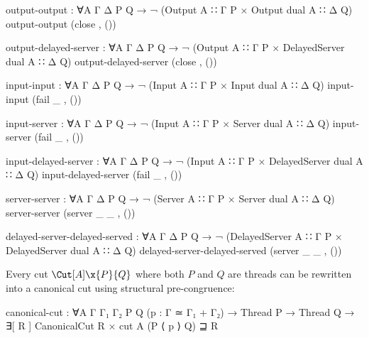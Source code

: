\begin{code}[hide]
output-output : ∀{A Γ Δ P Q} → ¬ (Output {A ∷ Γ} P × Output {dual A ∷ Δ} Q)
output-output (close , ())

output-delayed-server : ∀{A Γ Δ P Q} → ¬ (Output {A ∷ Γ} P × DelayedServer {dual A ∷ Δ} Q)
output-delayed-server (close , ())

input-input : ∀{A Γ Δ P Q} → ¬ (Input {A ∷ Γ} P × Input {dual A ∷ Δ} Q)
input-input (fail _ , ())

input-server : ∀{A Γ Δ P Q} → ¬ (Input {A ∷ Γ} P × Server {dual A ∷ Δ} Q)
input-server (fail _ , ())

input-delayed-server : ∀{A Γ Δ P Q} → ¬ (Input {A ∷ Γ} P × DelayedServer {dual A ∷ Δ} Q)
input-delayed-server (fail _ , ())

server-server : ∀{A Γ Δ P Q} → ¬ (Server {A ∷ Γ} P × Server {dual A ∷ Δ} Q)
server-server (server _ _ , ())

delayed-server-delayed-served : ∀{A Γ Δ P Q} → ¬ (DelayedServer {A ∷ Γ} P × DelayedServer {dual A ∷ Δ} Q)
delayed-server-delayed-served (server _ _ , ())
\end{code}

Every cut $\Cut[A]\x{P}{Q}$ where both $P$ and $Q$ are threads can be rewritten
into a canonical cut using structural pre-congruence:

\begin{code}
canonical-cut : ∀{A Γ Γ₁ Γ₂ P Q} (p : Γ ≃ Γ₁ + Γ₂) →
                Thread P → Thread Q →
                ∃[ R ] CanonicalCut R × cut {A} (P ⟨ p ⟩ Q) ⊒ R
\end{code}

